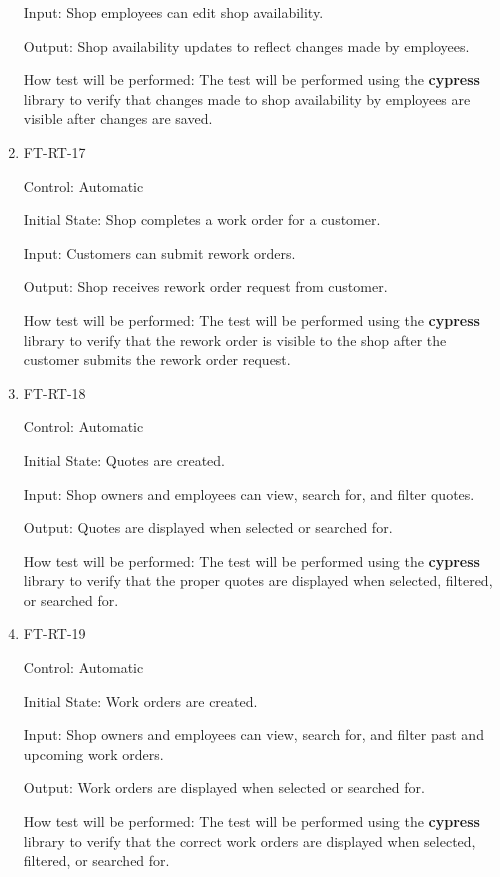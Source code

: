 \documentclass[12pt, titlepage]{article}
\begin{document}
\begin{enumerate}
Input: Shop employees can edit shop availability.

Output: Shop availability updates to reflect changes made by employees.

How test will be performed: The test will be performed using the \textbf{cypress} library to verify that changes made to shop availability by employees are visible after changes are saved.

\item{FT-RT-17\\}

Control: Automatic

Initial State: Shop completes a work order for a customer.

Input: Customers can submit rework orders.

Output: Shop receives rework order request from customer.

How test will be performed: The test will be performed using the \textbf{cypress} library to verify that the rework order is visible to the shop after the customer submits the rework order request.

\item{FT-RT-18\\}

Control: Automatic

Initial State: Quotes are created.

Input: Shop owners and employees can view, search for, and filter quotes.

Output: Quotes are displayed when selected or searched for.

How test will be performed: The test will be performed using the \textbf{cypress} library to verify that the proper quotes are displayed when selected, filtered, or searched for.

\item{FT-RT-19\\}

Control: Automatic

Initial State: Work orders are created.

Input: Shop owners and employees can view, search for, and filter past and upcoming work orders.

Output: Work orders are displayed when selected or searched for.

How test will be performed: The test will be performed using the \textbf{cypress} library to verify that the correct work orders are displayed when selected, filtered, or searched for.


\end{enumerate}
\end{document}
